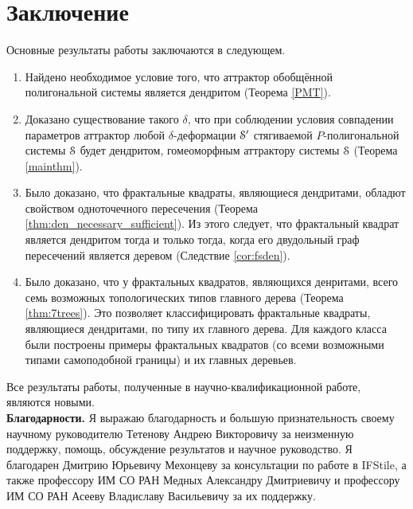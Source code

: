 \chapter*{Заключение}                       %


Основные результаты работы заключаются в следующем.

\begin{enumerate}
\item Найдено необходимое условие того, что аттрактор обобщённой полигональной системы является дендритом (Теорема \ref{PMT}). 

\item Доказано существование такого $\delta$, что при соблюдении условия совпадении параметров аттрактор любой $\delta$-деформации ${\EuScript S}'$ стягиваемой $P$-полигональной системы ${\EuScript S}$ будет дендритом, гомеоморфным аттрактору системы ${\EuScript S}$ (Теорема \ref{mainthm}).


\item Было доказано, что фрактальные квадраты, являющиеся дендритами, обладют свойством одноточечного пересечения (Теорема \ref{thm:den_necessary_sufficient}).
Из этого следует, что фрактальный квадрат является дендритом тогда и только тогда, когда его двудольный граф пересечений является деревом (Следствие \ref{cor:fsden}).

\item Было доказано, что у фрактальных квадратов, являющихся денритами, всего семь возможных топологических типов главного дерева (Теорема \ref{thm:7trees}).
Это позволяет классифицировать фрактальные квадраты, являющиеся дендритами, по типу их главного дерева.
Для каждого класса были построены примеры фрактальных квадратов (со всеми возможными типами самоподобной границы) и их главных деревьев.
\end{enumerate}

Все результаты работы, полученные в научно-квалификационной работе, являются новыми.
\\

\textbf{Благодарности.}
Я выражаю благодарность и большую признательность своему научному руководителю
Тетенову Андрею Викторовичу за неизменную поддержку, помощь, обсуждение результатов и научное
руководство.
Я благодарен Дмитрию Юрьевичу Мехонцеву за консультации по работе в IFStile, а также профессору ИМ СО РАН Медных Александру Дмитриевичу и профессору ИМ СО РАН Асееву Владиславу Васильевичу за их поддержку.